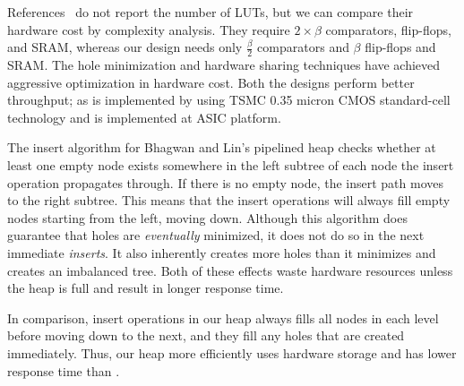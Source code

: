 References~\cite{fpga1,hw2} do not report the number of LUTs, but we can compare their hardware cost by complexity analysis.
They require $2 \times \beta$ comparators, flip-flops, and SRAM, whereas our design needs only $\frac{\beta}{2}$ comparators and $\beta$ flip-flops and SRAM.
The hole minimization and hardware sharing techniques have achieved aggressive optimization in hardware cost. Both the designs perform better throughput; as \cite{hw2} is implemented by using TSMC
0.35  micron CMOS standard-cell technology and \cite{fpga1} is implemented at ASIC platform.

The insert algorithm for Bhagwan and Lin's pipelined heap \cite{hw2} checks whether at least one empty node exists somewhere in the left subtree of each node the insert operation propagates through. 
If there is no empty node, the insert path moves to the right subtree. 
This means that the insert operations will always fill empty nodes starting from the left, moving down. 
Although this algorithm does guarantee that holes are {\it eventually} minimized, it does not do so in the next immediate {\it inserts}. 
It also inherently creates more holes than it minimizes and creates an imbalanced tree. 
Both of these effects waste hardware resources unless the heap is full and result in longer response time.

In comparison, insert operations in our heap always fills all nodes in each level before moving down to the next, and they fill any holes that are created immediately. Thus, our heap more efficiently uses hardware storage and has lower response time than \cite{hw2}.
